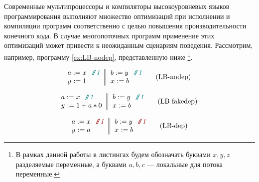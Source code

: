 
Современные мультипроцессоры и компиляторы 
высокоуровневых языков программирования
выполняют множество оптимизаций при исполнении
и компиляции программ соответственно с целью
повышения производительности конечного кода.
В случае многопоточных программ применение этих оптимизаций
может привести к неожиданным сценариям поведения.
Рассмотрим, например, программу \ref{ex:LB-nodep}, представленную ниже%
\footnote{В рамках данной работы в листингах будем обозначать
буквами $x, y, z$ разделяемые переменные,
а буквами $a, b, c$ --- локальные для потока переменные.}.

\begin{center}
\begin{minipage}{.32\linewidth}
{\small
\begin{equation}
\inarrII{
  \readInst{}{a}{x} \rfcomment{1} \\
  \writeInst{}{y}{1} \\
}{\readInst{}{b}{y} \rfcomment{1} \\
  \writeInst{}{x}{b}  \\
}%
\tag{LB-nodep}\label{ex:LB-nodep}
\end{equation}
}
\end{minipage}
%
\hfill\vline\hfill
\begin{minipage}{.32\linewidth}
{\small
\begin{equation}
\inarrII{
  \readInst{}{a}{x} \rfcomment{1} \\
  \writeInst{}{y}{1 + a * 0} \\
}{\readInst{}{b}{y} \rfcomment{1} \\
  \writeInst{}{x}{b}  \\
}
\tag{LB-fakedep}\label{ex:LB-fakedep}
\end{equation}
}
\end{minipage}
%
\hfill\vline\hfill
%
\begin{minipage}{.32\linewidth}
{\small
\begin{equation}
\inarrII{
  \readInst{}{a}{x} \nocomment{1} \\
  \writeInst{}{y}{a} \\
}{\readInst{}{b}{y} \nocomment{1} \\
  \writeInst{}{x}{b}  \\
}
\tag{LB-dep}\label{ex:LB-dep}
\end{equation}
}
\end{minipage}
\end{center}

